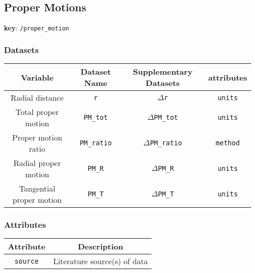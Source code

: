 \subsection{Proper Motions}

\textbf{key}: \texttt{/proper\_motion}

\subsubsection{Datasets}

\begin{center}
\begin{tabular}{ | c | c | c | c | }
    \hline
    Variable & Dataset Name & Supplementary Datasets &  attributes \\
    \hline\hline
    Radial distance & \texttt{r} & \texttt{\(\Delta\)r} & \texttt{units} \\
    \hline
    Total proper motion & \texttt{PM\_tot} & \texttt{\(\Delta\)PM\_tot} &
    \texttt{units}\\
    \hline
    Proper motion ratio & \texttt{PM\_ratio} & \texttt{\(\Delta\)PM\_ratio} &
    \texttt{method} \\
    \hline
    Radial proper motion & \texttt{PM\_R} & \texttt{\(\Delta\)PM\_R} &
    \texttt{units}\\
    \hline
    Tangential proper motion & \texttt{PM\_T} & \texttt{\(\Delta\)PM\_T} &
    \texttt{units}\\
    \hline
\end{tabular}
\end{center}

\subsubsection{Attributes}


\begin{center}
\begin{tabular}{ | c | c | }
    \hline
    Attribute & Description \\
    \hline\hline
    \texttt{source} & Literature source(s) of data \\
    \hline
\end{tabular}
\end{center}
